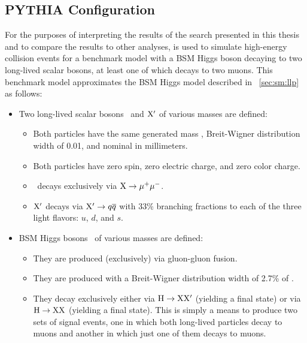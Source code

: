 \subsection{PYTHIA Configuration}
\label{sec:sm:pythia}
For the purposes of interpreting the results of the search presented in this thesis and to compare the results to other analyses,  \cite{Sjostrand:2014zea,Khachatryan:2015pea} is used to simulate high-energy collision events for a benchmark model with a BSM Higgs boson decaying to two long-lived scalar bosons, at least one of which decays to two muons.
This benchmark model approximates the BSM Higgs model described in \Sec~\ref{sec:sm:llp} as follows:
\begin{itemize}
  \item Two long-lived scalar bosons \PLLP\ and $\mathrm{X}^\prime$ of various masses \mX are defined:
    \begin{itemize}
      \item Both particles have the same generated mass \mX, Breit-Wigner distribution width of 0.01\GeV, and nominal \cTau in millimeters.
      \item Both particles have zero spin, zero electric charge, and zero color charge.
      \item \PLLP\ decays exclusively via $\mathrm{X} \to \mu^+\mu^-$.
      \item $\mathrm{X}^\prime$ decays via $\mathrm{X}^\prime \to q\overline{q}$ with 33\% branching fractions to each of the three light flavors: $u$, $d$, and $s$.
    \end{itemize}
  \item BSM Higgs bosons \PHiggs\ of various masses \mH are defined:
    \begin{itemize}
      \item They are produced (exclusively) via gluon-gluon fusion.
      \item They are produced with a Breit-Wigner distribution width of 2.7\% of \mH.
      \item They decay exclusively either via $\mathrm{H} \to \mathrm{X}\mathrm{X}^\prime$ (yielding a \twoMu final state) or via $\mathrm{H} \to \mathrm{X}\mathrm{X}$ (yielding a \fourMu final state). This is simply a means to produce two sets of signal events, one in which both long-lived particles decay to muons and another in which just one of them decays to muons.
    \end{itemize}
\end{itemize}

